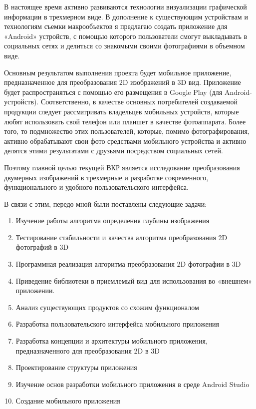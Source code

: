 В настоящее  время активно развиваются технологии визуализации графической информации в трехмерном виде. В дополнение к существующим устройствам и технологиям съемки макрообъектов я предлагаю создать приложение для «Android» устройств, с помощью которого пользователи смогут выкладывать в социальных сетях и делиться со знакомыми своими фотографиями в объемном виде.

Основным результатом выполнения проекта будет мобильное приложение, предназначенное для преобразования 2D изображений в 3D вид. Приложение будет распространяться с помощью его размещения в Google Play (для Android-устройств). Соответственно, в качестве основных потребителей создаваемой продукции следует рассматривать владельцев мобильных устройств, которые любят использовать свой телефон или планшет в качестве фотоаппарата. Более того, то подмножество этих пользователей, которые, помимо фотографирования, активно обрабатывают свои фото средствами мобильного устройства и активно делятся этими результатами с друзьями посредством социальных сетей.

Поэтому главной целью текущей ВКР является исследование	преобразования двумерных изображений в трехмерные и разработке современного, функционального и удобного пользовательского интерфейса.

В связи с этим, передо мной были поставлены следующие задачи:

\begin{enumerate}
	\item Изучение работы алгоритма определения глубины изображения
	\item Тестирование стабильности и качества алгоритма преобразования 2D фотографий в 3D
	\item Программная реализация алгоритма преобразования 2D фотографии в 3D
	\item Приведение библиотеки в приемлемый вид для использования во «внешнем» приложении.
	\item Анализ существующих продуктов со схожим функционалом
	\item Разработка пользовательского интерфейса мобильного приложения
	\item Разработка концепции и архитектуры мобильного приложения, предназначенного для преобразования 2D в 3D
	\item Проектирование структуры приложения
	\item Изучение основ разработки мобильного приложения в среде Android Studio
	\item Создание мобильного приложения

\end{enumerate}